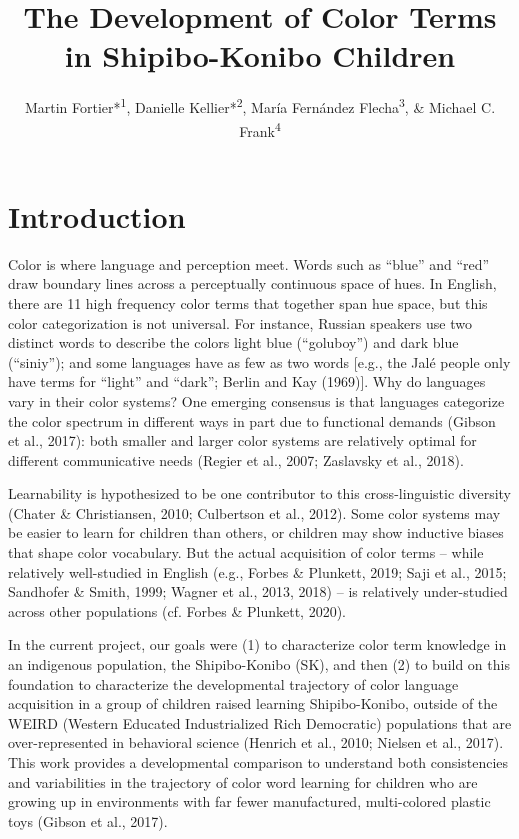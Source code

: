 \documentclass[
  english,
  ,apa7,floatsintext]{apa6}
\title{The Development of Color Terms in Shipibo-Konibo Children}
\author{Martin Fortier*\textsuperscript{1}, Danielle Kellier*\textsuperscript{2}, María Fernández Flecha\textsuperscript{3}, \& Michael C. Frank\textsuperscript{4}}
\date{}
\affiliation{\vspace{0.5cm}\textsuperscript{1} PSL Research University\\\textsuperscript{2} University of Pennsylvania\\\textsuperscript{3} Pontificia Universidad Católica del Perú\\\textsuperscript{4} Stanford University}
\begin{document}
\maketitle

\hypertarget{introduction}{%
\section{Introduction}\label{introduction}}

Color is where language and perception meet. Words such as ``blue'' and ``red'' draw boundary lines across a perceptually continuous space of hues. In English, there are 11 high frequency color terms that together span hue space, but this color categorization is not universal. For instance, Russian speakers use two distinct words to describe the colors light blue (``goluboy'') and dark blue (``siniy''); and some languages have as few as two words {[}e.g., the Jalé people only have terms for ``light'' and ``dark''; Berlin and Kay (1969){]}. Why do languages vary in their color systems? One emerging consensus is that languages categorize the color spectrum in different ways in part due to functional demands (Gibson et al., 2017): both smaller and larger color systems are relatively optimal for different communicative needs (Regier et al., 2007; Zaslavsky et al., 2018).

Learnability is hypothesized to be one contributor to this cross-linguistic diversity (Chater \& Christiansen, 2010; Culbertson et al., 2012). Some color systems may be easier to learn for children than others, or children may show inductive biases that shape color vocabulary. But the actual acquisition of color terms -- while relatively well-studied in English (e.g., Forbes \& Plunkett, 2019; Saji et al., 2015; Sandhofer \& Smith, 1999; Wagner et al., 2013, 2018) -- is relatively under-studied across other populations (cf. Forbes \& Plunkett, 2020).

In the current project, our goals were (1) to characterize color term knowledge in an indigenous population, the Shipibo-Konibo (SK), and then (2) to build on this foundation to characterize the developmental trajectory of color language acquisition in a group of children raised learning Shipibo-Konibo, outside of the WEIRD (Western Educated Industrialized Rich Democratic) populations that are over-represented in behavioral science (Henrich et al., 2010; Nielsen et al., 2017). This work provides a developmental comparison to understand both consistencies and variabilities in the trajectory of color word learning for children who are growing up in environments with far fewer manufactured, multi-colored plastic toys (Gibson et al., 2017).
\end{document}
